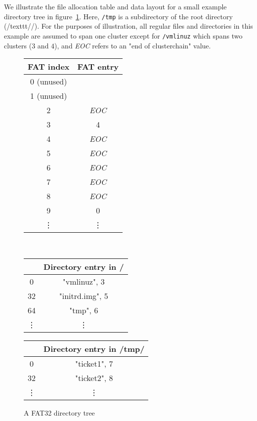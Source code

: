 \documentclass[submission,copyright,creativecommons]{eptcs}
\begin{document}
We illustrate the file allocation table and data layout for a small
example directory tree in figure~\ref{fat32-example}. Here,
\texttt{/tmp} is a subdirectory of the root directory
(/texttt{//}). For the purposes of illustration, all regular files and
directories in this example are assumed to span one cluster except for
\texttt{/vmlinuz} which spans two clusters ($3$ and $4$), and
\textit{EOC} refers to an "end of clusterchain" value.

\begin{figure}
  \centering
  \caption{A FAT32 directory tree}
  \label{fat32-example}

  \begin{tabular}{|c|c|}
    \hline
    FAT index & FAT entry \\ \hline
    0 (unused) &  \\ \hline
    1 (unused) &  \\ \hline
    2 & \textit{EOC} \\ \hline
    3 & 4 \\ \hline
    4 & \textit{EOC} \\ \hline
    5 & \textit{EOC} \\ \hline
    6 & \textit{EOC} \\ \hline
    7 & \textit{EOC} \\ \hline
    8 & \textit{EOC} \\ \hline
    9 & 0 \\ \hline
    \vdots & \vdots
  \end{tabular}\\

  \begin{tabular}{|c|c|}
    \hline
       & Directory entry in / \\ \hline
    0  & "vmlinuz", 3 \\ \hline
    32 & "initrd.img", 5 \\ \hline
    64 & "tmp", 6 \\ \hline
    \vdots & \vdots
  \end{tabular}

  \begin{tabular}{|c|c|}
    \hline
       & Directory entry in /tmp/ \\ \hline
    0  & "ticket1", 7 \\ \hline
    32 & "ticket2", 8 \\ \hline
    \vdots & \vdots
  \end{tabular}
\end{figure}
\end{document}
